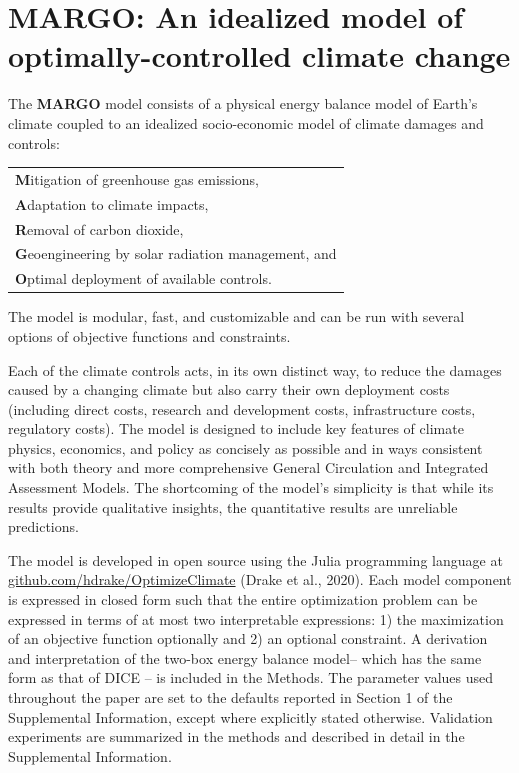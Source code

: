 \documentclass[9pt,twocolumn,twoside,lineno]{pnas-new}
\begin{document}
\section*{MARGO: An idealized model of optimally-controlled climate change}

The \textbf{MARGO} model consists of a physical energy balance model of Earth's climate coupled to an idealized socio-economic model of climate damages and controls:
\begin{center}
\begin{tabular}{l}
\textbf{M}itigation of greenhouse gas emissions, \\
\textbf{A}daptation to climate impacts, \\
\textbf{R}emoval of carbon dioxide, \\
\textbf{G}eoengineering by solar radiation management, and\\
\textbf{O}ptimal deployment of available controls.
\end{tabular}
\end{center}
The model is modular, fast, and customizable and can be run with several options of objective functions and constraints.

Each of the climate controls acts, in its own distinct way, to reduce the damages caused by a changing climate but also carry their own deployment costs (including direct costs, research and development costs, infrastructure costs, regulatory costs). The model is designed to include key features of climate physics, economics, and policy as concisely as possible and in ways consistent with both theory and more comprehensive General Circulation and Integrated Assessment Models. The shortcoming of the model's simplicity is that while its results provide qualitative insights, the quantitative results are unreliable predictions.

The model is developed in open source using the Julia programming language \cite{bezanson_julia:_2017} at \url{github.com/hdrake/OptimizeClimate} (Drake et al., 2020). Each model component is expressed in closed form such that the entire optimization problem can be expressed in terms of at most two interpretable expressions: 1) the maximization of an objective function optionally and 2) an optional constraint. A derivation and interpretation of the two-box energy balance model– which has the same form as that of DICE \cite{nordhaus2013dice}– is included in the Methods. The parameter values used throughout the paper are set to the defaults reported in Section 1 of the Supplemental Information, except where explicitly stated otherwise. Validation experiments are summarized in the methods and described in detail in the Supplemental Information.
\end{document}
